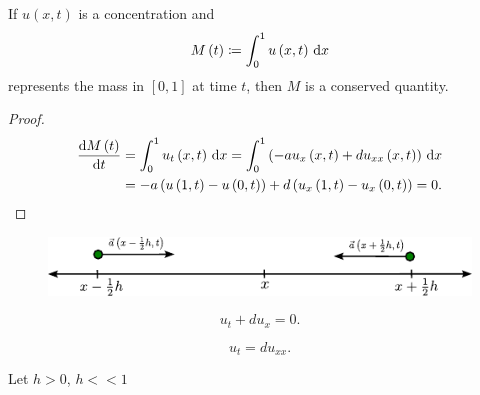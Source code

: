 \begin{frame}

    \begin{theorem}
        If $u\left(x,t\right)$ is a concentration and
        \begin{equation*}
            M\left(t\right)\coloneqq
            \int_{0}^{1}
            u\left(x,t\right)
            \dl x
        \end{equation*}
        represents the mass in $\left[0,1\right]$ at time $t$, then
        $M$ is a conserved quantity.
    \end{theorem}

    \begin{proof}
        \begin{align*}
            \diff{M\left(t\right)}{t} & =
            \int_{0}^{1}
            u_{t}\left(x,t\right)
            \dl x=
            \int_{0}^{1}
            \left(
            -au_{x}\left(x,t\right)+
            du_{xx}\left(x,t\right)
            \right)\dl x                  \\
                                      & =
            -a\left(
            u\left(1,t\right)-
            u\left(0,t\right)
            \right)+
            d\left(
            u_{x}\left(1,t\right)-
            u_{x}\left(0,t\right)
            \right)=0.
        \end{align*}
    \end{proof}
\end{frame}

\begin{frame}
    \begin{figure}[ht!]
        \centering
        \includegraphics[width=.4\paperwidth]{deduction}
    \end{figure}

    \begin{definition}
        \begin{equation*}
            u_{t}+du_{x}=0.
        \end{equation*}
    \end{definition}

    \begin{definition}
        \begin{equation*}
            u_{t}=
            du_{xx}.
        \end{equation*}
    \end{definition}

    Let $h>0$, $h<<1$
\end{frame}
